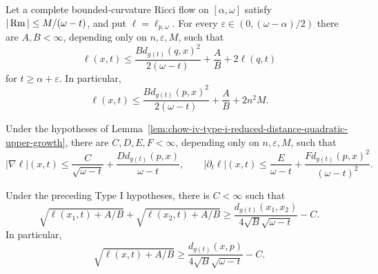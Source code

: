 \begin{lemma}
\label{lem:chow-iv-type-i-reduced-distance-quadratic-upper-growth}

Let a complete bounded-curvature Ricci flow on \([\alpha,\omega]\) satisfy
\(|\operatorname{Rm}|\leq M/(\omega-t)\), and put \(\ell=\ell_{p,\omega}\).  For every
\(\varepsilon\in(0,(\omega-\alpha)/2)\) there are \(A,B<\infty\), depending
only on \(n,\varepsilon,M\), such that
\[
 \ell(x,t)\leq
 \frac{B d_{g(t)}(q,x)^2}{2(\omega-t)}+\frac AB+2\ell(q,t)
\]
for \(t\geq\alpha+\varepsilon\).  In particular,
\[
 \ell(x,t)\leq
 \frac{B d_{g(t)}(p,x)^2}{2(\omega-t)}+\frac AB+2n^2M.
\]
\end{lemma}

\begin{corollary}
\label{cor:chow-iv-type-i-reduced-distance-derivative-bounds}


Under the hypotheses of
Lemma~\ref{lem:chow-iv-type-i-reduced-distance-quadratic-upper-growth}, there
are \(C,D,E,F<\infty\), depending only on \(n,\varepsilon,M\), such that
\[
 |\nabla\ell|(x,t)\leq \frac C{\sqrt{\omega-t}}
 +\frac{D d_{g(t)}(p,x)}{\omega-t},
\qquad
 |\partial_t\ell|(x,t)\leq\frac E{\omega-t}
 +\frac{F d_{g(t)}(p,x)^2}{(\omega-t)^2}.
\]
\end{corollary}

\begin{lemma}
\label{lem:chow-iv-type-i-reduced-distance-lower-bound}


Under the preceding Type I hypotheses, there is \(C<\infty\) such that
\[
 \sqrt{\ell(x_1,t)+A/B}+\sqrt{\ell(x_2,t)+A/B}
 \geq \frac{d_{g(t)}(x_1,x_2)}{4\sqrt B\sqrt{\omega-t}}-C.
\]
In particular,
\[
 \sqrt{\ell(x,t)+A/B}
 \geq\frac{d_{g(t)}(x,p)}{4\sqrt B\sqrt{\omega-t}}-C.
\]
\end{lemma}

